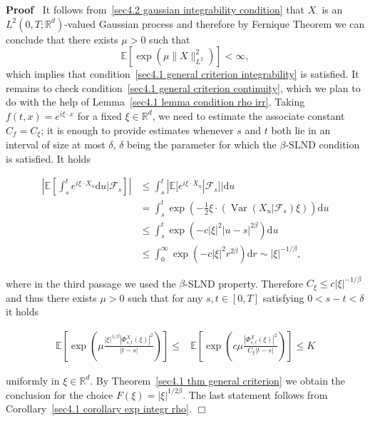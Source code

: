 \documentclass[10pt]{article}
\newcommand{\mathd}{\mathrm{d}}
\newcommand{\nobracket}{}
\newcommand{\tmop}[1]{\ensuremath{\operatorname{#1}}}
\newenvironment{proof}{\noindent\textbf{Proof\ }}{\hspace*{\fill}$\Box$\medskip}
\begin{document}
\begin{proof}
  It follows from~{\eqref{sec4.2 gaussian integrability condition}} that
  $X_{\cdot}$ is an $L^2 (0, T ; \mathbb{R}^d)$-valued Gaussian process and
  therefore by Fernique Theorem we can conclude that there exists $\mu > 0$
  such that
  \[ \mathbb{E} [\exp (\mu \| X \|_{L^2}^2)] < \infty, \]
  which implies that condition~{\eqref{sec4.1 general criterion
  integrability}} is satisfied. It remains to check condition~{\eqref{sec4.1
  general criterion continuity}}, which we plan to do with the help of
  Lemma~\ref{sec4.1 lemma condition rho irr}. Taking $f (t, x) = e^{i \xi
  \cdot x}$ for a fixed $\xi \in \mathbb{R}^d$, we need to estimate the
  associate constant $C_f = C_{\xi}$; it is enough to provide estimates
  whenever $s$ and $t$ both lie in an interval of size at most $\delta$,
  $\delta$ being the parameter for which the $\beta$\mbox{-}SLND condition is
  satisfied. It holds
  
  \begin{align}
    \left| \mathbb{E} \left[ \int_s^t e^{i \xi \cdot X_u} \mathd u |
    \mathcal{F}_s \nobracket \right] \right| & \leqslant \int_s^t | \mathbb{E}
    [e^{i \xi \cdot X_u} | \mathcal{F}_s \nobracket] | \mathd u\\
    & = \int_s^t \exp \left( - \frac{1}{2} \xi \cdot (\tmop{Var} (X_u |
    \mathcal{F}_s \nobracket) \xi) \right) \mathd u\\
    & \leqslant \int_s^t \exp (- c | \xi |^2 | u - s |^{2 \beta}) \mathd u\\
    & \leqslant \int_0^{\infty} \exp (- c | \xi |^2 r^{2 \beta}) \mathd r
    \sim | \xi |^{- 1 / \beta},
  \end{align}
  
  where in the third passage we used the $\beta$-SLND property. Therefore
  $C_{\xi} \leqslant c | \xi |^{- 1 / \beta}$ and thus there exists $\mu > 0$
  such that for any $s, t \in [0, T]$ satisfying $0 < s - t < \delta$ it holds
  
  \begin{align}
    \mathbb{E} \left[ \exp \left( \mu \frac{| \xi |^{1 / \beta} | \Phi_{s,
    t}^X (\xi) |^2}{| t - s |} \right) \right] \leqslant & \mathbb{E} \left[
    \exp \left( c \mu \frac{| \Phi_{s, t}^X (\xi) |^2}{C_{\xi} | t - s |}
    \right) \right] \leqslant K
  \end{align}
  
  uniformly in $\xi \in \mathbb{R}^d$. By Theorem~\ref{sec4.1 thm general
  criterion} we obtain the conclusion for the choice $F (\xi) = | \xi |^{1 / 2
  \beta}$. The last statement follows from Corollary~\ref{sec4.1 corollary exp
  integr rho}.
\end{proof}
\end{document}
